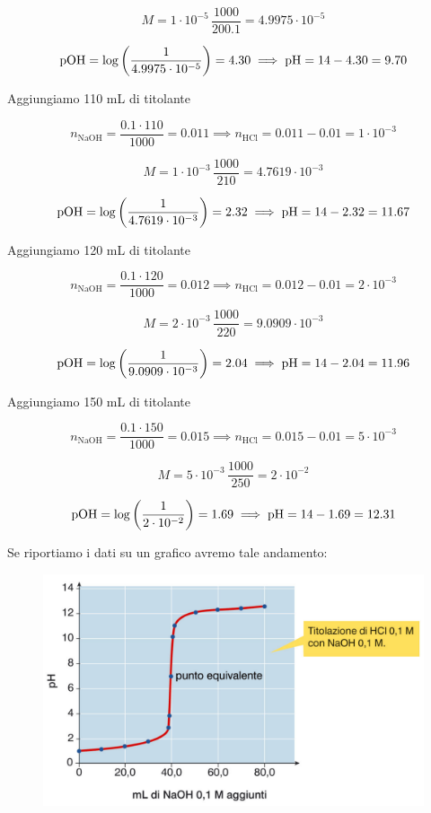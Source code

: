 $$M=1 \cdot 10^{-5} \, \frac{1000}{200.1}=4.9975 \cdot 10^{-5}$$

$$\rm pOH=\log \left( \frac{1}{4.9975 \cdot 10^{-5}} \right)=4.30 \implies \rm pH=14-4.30=9.70$$

Aggiungiamo 110 mL di titolante

$$n_{\text{NaOH}}=\frac{0.1 \cdot 110}{1000}= 0.011\implies n_{\text{HCl}}=0.011-0.01 = 1 \cdot 10^{-3}$$

$$M=1 \cdot 10^{-3} \, \frac{1000}{210}=4.7619 \cdot 10^{-3}$$

$$\rm pOH=\log \left( \frac{1}{4.7619 \cdot 10^{-3}} \right)=2.32 \implies \rm pH=14-2.32=11.67$$

Aggiungiamo 120 mL di titolante

$$n_{\text{NaOH}}=\frac{0.1 \cdot 120}{1000}= 0.012\implies n_{\text{HCl}}=0.012-0.01 = 2 \cdot 10^{-3}$$

$$M=2 \cdot 10^{-3} \, \frac{1000}{220}=9.0909 \cdot 10^{-3}$$

$$\rm pOH=\log \left( \frac{1}{9.0909 \cdot 10^{-3}} \right)=2.04 \implies \rm pH=14-2.04=11.96$$

Aggiungiamo 150 mL di titolante

$$n_{\text{NaOH}}=\frac{0.1 \cdot 150}{1000}= 0.015\implies n_{\text{HCl}}=0.015-0.01 = 5 \cdot 10^{-3}$$

$$M=5 \cdot 10^{-3} \, \frac{1000}{250}=2 \cdot 10^{-2}$$

$$\rm pOH=\log \left( \frac{1}{2 \cdot 10^{-2}} \right)=1.69 \implies \rm pH=14-1.69=12.31$$

Se riportiamo i dati su un grafico avremo tale andamento:

\begin{figure}[H]
    \hspace{1.3cm}\includegraphics[width=14cm]{immagini/titolazione_acido_forte_base_forte.png}
\end{figure}

